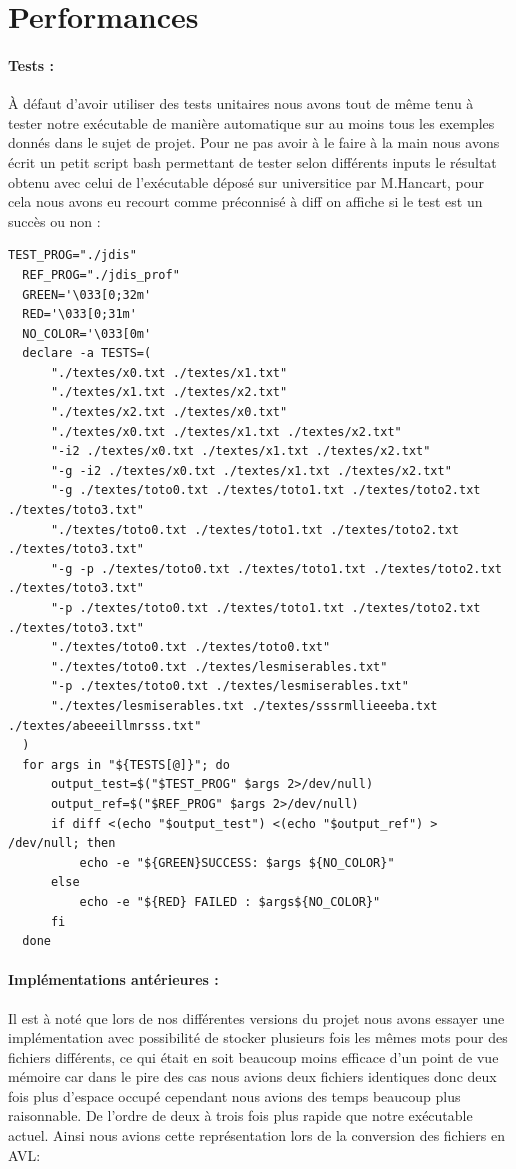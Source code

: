\documentclass{article}
\begin{document}
\section{Performances}\label{sec:perf}
\paragraph{Tests :}
À défaut d'avoir utiliser des tests unitaires nous avons tout de même tenu à tester notre exécutable de manière automatique sur au moins
tous les exemples donnés dans le sujet de projet. Pour ne pas avoir à le faire à la main nous avons écrit un 
petit script bash permettant de tester selon différents inputs le résultat obtenu avec celui de l'exécutable déposé sur universitice par 
M.Hancart, pour cela nous avons eu recourt comme préconnisé à diff on affiche si le test est un succès ou non :
\begin{lstlisting}[style=Cstyle]
  TEST_PROG="./jdis"
  REF_PROG="./jdis_prof"
  GREEN='\033[0;32m'
  RED='\033[0;31m'
  NO_COLOR='\033[0m'    
  declare -a TESTS=(
      "./textes/x0.txt ./textes/x1.txt"
      "./textes/x1.txt ./textes/x2.txt"
      "./textes/x2.txt ./textes/x0.txt"
      "./textes/x0.txt ./textes/x1.txt ./textes/x2.txt"
      "-i2 ./textes/x0.txt ./textes/x1.txt ./textes/x2.txt"
      "-g -i2 ./textes/x0.txt ./textes/x1.txt ./textes/x2.txt"
      "-g ./textes/toto0.txt ./textes/toto1.txt ./textes/toto2.txt ./textes/toto3.txt"
      "./textes/toto0.txt ./textes/toto1.txt ./textes/toto2.txt ./textes/toto3.txt"
      "-g -p ./textes/toto0.txt ./textes/toto1.txt ./textes/toto2.txt ./textes/toto3.txt"
      "-p ./textes/toto0.txt ./textes/toto1.txt ./textes/toto2.txt ./textes/toto3.txt"
      "./textes/toto0.txt ./textes/toto0.txt"
      "./textes/toto0.txt ./textes/lesmiserables.txt"
      "-p ./textes/toto0.txt ./textes/lesmiserables.txt"
      "./textes/lesmiserables.txt ./textes/sssrmllieeeba.txt ./textes/abeeeillmrsss.txt"
  )
  for args in "${TESTS[@]}"; do
      output_test=$("$TEST_PROG" $args 2>/dev/null)
      output_ref=$("$REF_PROG" $args 2>/dev/null)
      if diff <(echo "$output_test") <(echo "$output_ref") > /dev/null; then
          echo -e "${GREEN}SUCCESS: $args ${NO_COLOR}"
      else
          echo -e "${RED} FAILED : $args${NO_COLOR}"
      fi
  done
\end{lstlisting}

\paragraph{Implémentations antérieures :} Il est à noté que lors de nos différentes versions du projet nous avons 
essayer une implémentation avec possibilité de stocker plusieurs fois les mêmes mots pour des fichiers différents,
ce qui était en soit beaucoup moins efficace d'un point de vue mémoire car dans le pire des cas nous avions deux fichiers
identiques donc deux fois plus d'espace occupé cependant nous avions des temps beaucoup plus raisonnable. De l'ordre de deux
à trois fois plus rapide que notre exécutable actuel. Ainsi nous avions cette représentation lors de la conversion des fichiers en AVL:
\end{document}
